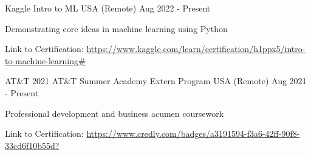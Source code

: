 

\begin{cventries}

\cventry
    {Kaggle} %
    {Intro to ML} %
    {USA (Remote)} %
    {Aug 2022 - Present} %
    {
      \begin{cvitems} %
        \item {Demonstrating core ideas in machine learning using Python}
	\item{Link to Certification: \href{https://www.kaggle.com/learn/certification/h1ppx5/intro-to-machine-learning\#}{https://www.kaggle.com/learn/certification/h1ppx5/intro-to-machine-learning\#}}
      \end{cvitems}
    }


\cventry
    {AT\&T} %
    {2021 AT\&T Summer Academy Extern Program} %
    {USA (Remote)} %
    {Aug 2021 - Present} %
    {
      \begin{cvitems} %
        \item {Professional development and business acumen coursework}
	\item{Link to Certification: \href{https://www.credly.com/badges/a3191594-f3a6-42ff-90f8-33cd6f10b55d?}{https://www.credly.com/badges/a3191594-f3a6-42ff-90f8-33cd6f10b55d?}}
      \end{cvitems}
    }

\end{cventries}
